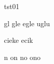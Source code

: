 \documentclass[a4paper, wide, 12pt]{mwart}
\begin{document}
\huge tst01

{\fonta gl gle egle uglu

cieke ecik

n on no ono }
\end{document}
